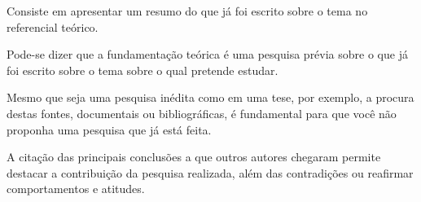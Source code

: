 Consiste em apresentar um resumo do que já foi escrito sobre o tema no referencial teórico.

Pode-se dizer que a fundamentação teórica é uma pesquisa prévia sobre o que já foi escrito sobre o tema sobre o qual pretende estudar.

Mesmo que seja uma pesquisa inédita como em uma tese, por exemplo, a procura destas fontes, documentais ou bibliográficas, é fundamental para que você não proponha uma pesquisa que já está feita.

A citação das principais conclusões a que outros autores chegaram permite destacar a contribuição da pesquisa realizada, além das contradições ou reafirmar comportamentos e atitudes.
